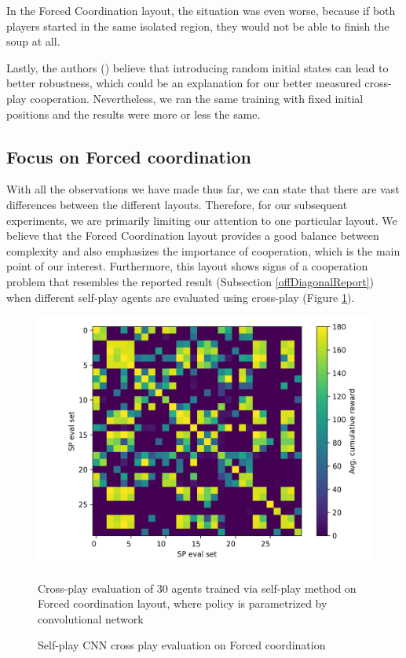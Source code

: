 In the Forced Coordination layout, the situation was even worse, because if both players started in the same isolated region, they would not be able to finish the soup at all.

Lastly, the authors (\cite{knott2021evaluating}) believe that introducing random initial states can lead to better robustness, which could be an explanation for our better measured cross-play cooperation.
Nevertheless, we ran the same training with fixed initial positions and the results were more or less the same.

\subsection{Focus on Forced coordination}
With all the observations we have made thus far, we can state that there are vast differences between the different layouts. 
Therefore, for our subsequent experiments, we are primarily limiting our attention to one particular layout.
We believe that the Forced Coordination layout provides a good balance between complexity and also emphasizes the importance of cooperation, which is the main point of our interest.
Furthermore, this layout shows signs of a cooperation problem that resembles the reported result (Subsection \ref{offDiagonalReport}) when different self-play agents are evaluated using cross-play (Figure \ref{ForcedCoordinationCNNSPCrossPlay}).

\begin{figure}[!ht]
  \centering
  \includegraphics*[width=14cm]{../img/Forced_coordination_CNN_SP_CrossPlay(5).png}
  \caption{Self-play CNN cross play evaluation on Forced coordination}
  \label{ForcedCoordinationCNNSPCrossPlay}
  \medskip
  \small 
  Cross-play evaluation of 30 agents trained via self-play method on Forced coordination layout, where policy is parametrized by convolutional network

\end{figure}